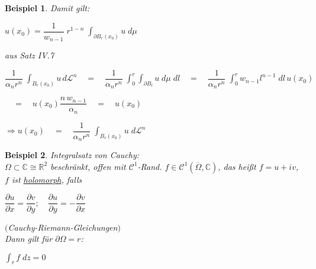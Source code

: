 \documentclass[11pt]{memoir}
\theoremstyle{changebreak}
\newtheorem{Beispiel}{Beispiel}[chapter]
\newcommand{\dom}{\partial\Omega}
\newcommand{\oo}{\overline{\Omega}}
\begin{document}
\begin{Beispiel}
\par\bigskip
Damit gilt:
\begin{center}
	$u(x_0) = \dfrac{1}{w_{n-1}}\; r^{1-n} \; \int_{\partial B_r(x_0)} u \; d\mu$
\end{center}

aus Satz IV.7
\par\bigskip
$\dfrac{1}{\alpha_n r^n} \; \int_{B_r(x_0)} u \, d\mathscr L^n 
\quad = \quad 
\dfrac{1}{\alpha_n r^n} \; \int_0^r \int_{\partial B_l} u \; d\mu \;dl
\quad = \quad 
\dfrac{1}{\alpha_n r^n} \; \int_0^r w_{n-1} l^{n-1} \; dl \, u(x_0)$
\par\bigskip
$\quad = \quad u(x_0) \dfrac{n \,w_{n-1}}{\alpha_n} 
\quad = \quad
u(x_0)$
\begin{center}
	$\Rightarrow u(x_0) \quad = \quad \dfrac{1}{\alpha_n r^n} \; \int_{B_r(x_0)} u \;d\mathscr L^n$
\end{center}

\end{Beispiel}

\begin{Beispiel}
\emph{Integralsatz von Cauchy}: \\
$\Omega \subset \mathbb C \cong \mathbb R^2$ beschränkt, offen mit $\mathscr C^1$-Rand.
$f \in \mathscr C^1(\oo, \mathbb C)$, das heißt $f = u + i v$, $f$ ist \underline{holomorph}, falls
\begin{center}
	$\dfrac{\partial u}{\partial x} = \dfrac{\partial v}{\partial y}; \quad \dfrac{\partial u}{\partial y} = - \dfrac{\partial v}{\partial x}$
\end{center}
$($Cauchy-Riemann-Gleichungen$)$ \\
Dann gilt für $\dom = r$:
\begin{center}
	$\int_r f\; dz = 0$
\end{center}
\end{Beispiel}
\end{document}
